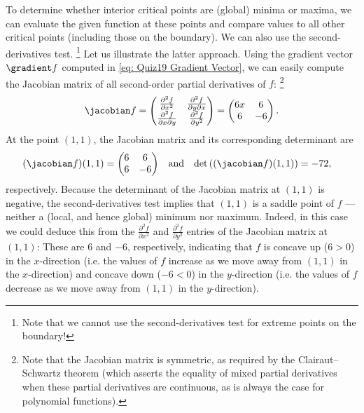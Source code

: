 {\begin{remark}
To determine whether interior critical points are (global) minima or maxima, we can evaluate the given function at these points and compare values to all other critical points (including those on the boundary). We can also use the second-derivatives test.%
\footnote{Note that we cannot use the second-derivatives test for extreme points on the boundary!} %
Let us illustrate the latter approach. Using the gradient vector $\gradient f$ computed in \eqref{eq: Quiz19 Gradient Vector}, we can easily compute the Jacobian matrix of all second-order partial derivatives of $f$:%
\footnote{Note that the Jacobian matrix is symmetric, as required by the Clairaut--Schwartz theorem (which asserts the equality of mixed partial derivatives when these partial derivatives are continuous, as is always the case for polynomial functions).}%
\begin{align*}
\jacobian f
=
\begin{pmatrix}
\frac{\partial^{2} f}{\partial x^{2}}			&	\frac{\partial^{2} f}{\partial y \partial x}	\\
\frac{\partial^{2} f}{\partial x \partial y}	&	\frac{\partial^{2} f}{\partial y^{2}}
\end{pmatrix}
=
\begin{pmatrix}
6 x	&	6	\\
6	&	-6
\end{pmatrix}.
\end{align*}
At the point $(1,1)$, the Jacobian matrix and its corresponding determinant are
\begin{align*}
(\jacobian f)(1,1)
&=
\begin{pmatrix}
6	&	6	\\
6	&	-6
\end{pmatrix}
&
&\text{and}
&
\det\left((\jacobian f)(1,1)\right)
&=
-72,
\end{align*}
respectively. Because the determinant of the Jacobian matrix at $(1,1)$ is negative, the second-derivatives test implies that $(1,1)$ is a saddle point of $f$ --- neither a (local, and hence global) minimum nor maximum. Indeed, in this case we could deduce this from the $\frac{\partial^{2} f}{\partial x^{2}}$ and $\frac{\partial^{2} f}{\partial y^{2}}$ entries of the Jacobian matrix at $(1,1)$: These are $6$ and $-6$, respectively, indicating that $f$ is concave up ($6 > 0$) in the $x$-direction (i.e. the values of $f$ increase as we move away from $(1,1)$ in the $x$-direction) and concave down ($-6 < 0$) in the $y$-direction (i.e. the values of $f$ decrease as we move away from $(1,1)$ in the $y$-direction).
\end{remark}
}%



